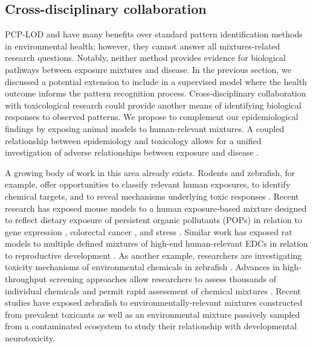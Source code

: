 \subsection{Cross-disciplinary collaboration}
PCP-LOD and \bnmf have many benefits over standard pattern identification methods in environmental health; however, they cannot answer all mixtures-related research questions. Notably, neither method provides evidence for biological pathways between exposure mixtures and disease. In the previous section, we discussed a potential extension to include \bnmf in a supervised model where the health outcome informs the pattern recognition process. Cross-disciplinary collaboration with toxicological research could provide another means of identifying biological responses to observed patterns. We propose to complement our epidemiological findings by exposing animal models to human-relevant mixtures. A coupled relationship between epidemiology and toxicology allows for a unified investigation of adverse relationships between exposure and disease \cite{adami2011toxicology}.

A growing body of work in this area already exists. Rodents and zebrafish, for example, offer opportunities to classify relevant human exposures, to identify chemical targets, and to reveal mechanisms underlying toxic responses \cite{vaz2019zebrafish}. Recent research has exposed mouse models to a human exposure-based mixture designed to reflect dietary exposure of persistent organic pollutants (POPs) in relation to gene expression \cite{myhre2021maternal}, colorectal cancer \cite{johanson2020maternal}, and stress \cite{hudecova2018human, berntsen2017design}. Similar work has exposed rat models to multiple defined mixtures of high-end human-relevant EDCs in relation to reproductive development \cite{johansson2020calretinin, isling2014late, axelstad2018edc, johansson2016perinatal, ramhoj2018perfluorohexane, christiansen2012mixtures, axelstad2014mixtures}. As another example, researchers are investigating toxicity mechanisms of environmental chemicals in zebrafish \cite{vaz2019zebrafish}. Advances in high-throughput screening approaches allow researchers to assess thousands of individual chemicals and permit rapid assessment of chemical mixtures \cite{tanguay2018rise}. Recent studies have exposed zebrafish to environmentally-relevant mixtures constructed from prevalent toxicants \cite{geier2018systematic} as well as an environmental mixture passively sampled from a contaminated ecosystem \cite{bergmann2017using, allan2012bridging} to study their relationship with developmental neurotoxicity.

